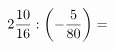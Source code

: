 \documentclass[preview]{standalone}
\begin{document}
\begin{align*}
2 { 10 \over 16 }  :  \left( - { 5 \over 80 } \right)  =
\end{align*}
\end{document}
